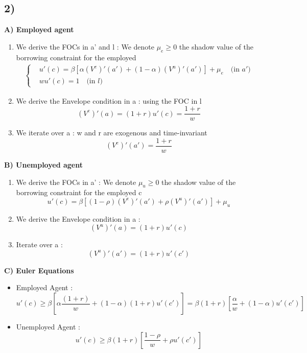 \documentclass{article}
\begin{document}
\subsection*{2)}
\textbf{A) Employed agent}
\begin{enumerate}
    \item We derive the FOCs in a' and l : We denote $\mu_e\ge0$ the shadow value of the borrowing constraint for the employed 
    $$\begin{aligned}
        \left\{\begin{aligned}
            &u'(c) = \beta [\alpha (V^e)'(a') + (1-\alpha)(V^u)'(a')]+\mu_e\quad (\text{in $a'$)}\\
            &wu'(c)=1 \quad  (\text{in $l$)}
        \end{aligned} \right. 
    \end{aligned}$$
    \item We derive the Envelope condition in a : using the FOC in l 
    $$(V^e)'(a)=(1+r)u'(c)=\frac{1+r}{w}$$
    \item We iterate over a : w and r are exogenous and time-invariant
    $$(V^e)' (a')=\frac{1+r}{w}$$
\end{enumerate}
\textbf{B) Unemployed agent}
\begin{enumerate}
    \item  We derive the FOCs in a' : We denote $\mu_u\ge0$ the shadow value of the borrowing constraint for the employed c
    $$u'(c) = \beta [(1-\rho)(V^e)'(a')+\rho(V^u)'(a')]+\mu_u$$
    \item We derive the Envelope condition in a : 
    $$(V^u)'(a)=(1+r)u'(c)$$
    \item Iterate over a : 
    $$(V^u)'(a') = (1+r)u'(c')$$
\end{enumerate}
\textbf{C) Euler Equations}
\begin{itemize}
    \item Employed Agent : 
    $$u'(c) \geq  \beta[\alpha\frac{(1+r)}{w}+(1-\alpha)(1+r)u'(c')]=\beta (1+r)[\frac{\alpha}{w}+(1-\alpha)u'(c')]$$
    \item Unemployed Agent : 
    $$u'(c) \geq \beta (1+r)[\frac{1-\rho}{w}+\rho u'(c')]$$
\end{itemize}
\end{document}
